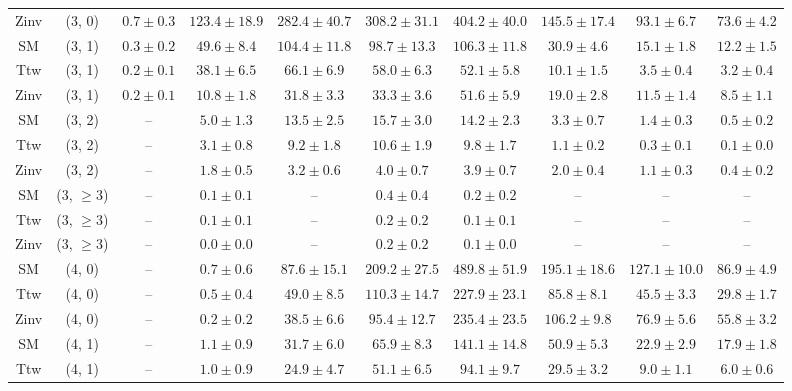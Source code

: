\begin{table}[h!]
{\begin{tabular}{cccccccccc}
	Zinv & (3, 0) & $0.7\pm 0.3$ & $123.4\pm 18.9$ & $282.4\pm 40.7$ & $308.2\pm 31.1$ & $404.2\pm 40.0$ & $145.5\pm 17.4$ & $93.1\pm 6.7$ & $73.6\pm 4.2$ \\[0.5ex] 
	SM & (3, 1) & $0.3\pm 0.2$ & $49.6\pm 8.4$ & $104.4\pm 11.8$ & $98.7\pm 13.3$ & $106.3\pm 11.8$ & $30.9\pm 4.6$ & $15.1\pm 1.8$ & $12.2\pm 1.5$ \\[0.5ex] 
	Ttw & (3, 1) & $0.2\pm 0.1$ & $38.1\pm 6.5$ & $66.1\pm 6.9$ & $58.0\pm 6.3$ & $52.1\pm 5.8$ & $10.1\pm 1.5$ & $3.5\pm 0.4$ & $3.2\pm 0.4$ \\[0.5ex] 
	Zinv & (3, 1) & $0.2\pm 0.1$ & $10.8\pm 1.8$ & $31.8\pm 3.3$ & $33.3\pm 3.6$ & $51.6\pm 5.9$ & $19.0\pm 2.8$ & $11.5\pm 1.4$ & $8.5\pm 1.1$ \\[0.5ex] 
	SM & (3, 2) & -- & $5.0\pm 1.3$ & $13.5\pm 2.5$ & $15.7\pm 3.0$ & $14.2\pm 2.3$ & $3.3\pm 0.7$ & $1.4\pm 0.3$ & $0.5\pm 0.2$ \\[0.5ex] 
	Ttw & (3, 2) & -- & $3.1\pm 0.8$ & $9.2\pm 1.8$ & $10.6\pm 1.9$ & $9.8\pm 1.7$ & $1.1\pm 0.2$ & $0.3\pm 0.1$ & $0.1\pm 0.0$ \\[0.5ex] 
	Zinv & (3, 2) & -- & $1.8\pm 0.5$ & $3.2\pm 0.6$ & $4.0\pm 0.7$ & $3.9\pm 0.7$ & $2.0\pm 0.4$ & $1.1\pm 0.3$ & $0.4\pm 0.2$ \\[0.5ex] 
	SM & (3, $\ge3$) & -- & $0.1\pm 0.1$ & -- & $0.4\pm 0.4$ & $0.2\pm 0.2$ & -- & -- & -- \\[0.5ex] 
	Ttw & (3, $\ge3$) & -- & $0.1\pm 0.1$ & -- & $0.2\pm 0.2$ & $0.1\pm 0.1$ & -- & -- & -- \\[0.5ex] 
	Zinv & (3, $\ge3$) & -- & $0.0\pm 0.0$ & -- & $0.2\pm 0.2$ & $0.1\pm 0.0$ & -- & -- & -- \\[0.5ex] 
	SM & (4, 0) & -- & $0.7\pm 0.6$ & $87.6\pm 15.1$ & $209.2\pm 27.5$ & $489.8\pm 51.9$ & $195.1\pm 18.6$ & $127.1\pm 10.0$ & $86.9\pm 4.9$ \\[0.5ex] 
	Ttw & (4, 0) & -- & $0.5\pm 0.4$ & $49.0\pm 8.5$ & $110.3\pm 14.7$ & $227.9\pm 23.1$ & $85.8\pm 8.1$ & $45.5\pm 3.3$ & $29.8\pm 1.7$ \\[0.5ex] 
	Zinv & (4, 0) & -- & $0.2\pm 0.2$ & $38.5\pm 6.6$ & $95.4\pm 12.7$ & $235.4\pm 23.5$ & $106.2\pm 9.8$ & $76.9\pm 5.6$ & $55.8\pm 3.2$ \\[0.5ex] 
	SM & (4, 1) & -- & $1.1\pm 0.9$ & $31.7\pm 6.0$ & $65.9\pm 8.3$ & $141.1\pm 14.8$ & $50.9\pm 5.3$ & $22.9\pm 2.9$ & $17.9\pm 1.8$ \\[0.5ex] 
	Ttw & (4, 1) & -- & $1.0\pm 0.9$ & $24.9\pm 4.7$ & $51.1\pm 6.5$ & $94.1\pm 9.7$ & $29.5\pm 3.2$ & $9.0\pm 1.1$ & $6.0\pm 0.6$ \\[0.5ex] 

\end{tabular}}
\end{table}
